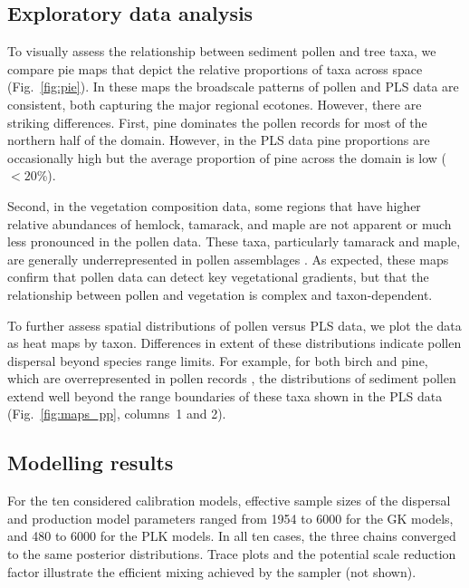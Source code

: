 \documentclass[12pt]{article}
\begin{document}
\subsection{Exploratory data analysis}

To visually assess the relationship between sediment pollen and tree
taxa, we compare pie maps that depict the relative proportions of taxa
across space (Fig.~\ref{fig:pie}). In these maps the broadscale
patterns of pollen and PLS data are consistent, both capturing the
major regional ecotones.  However, there are striking
differences. First, pine dominates the pollen records for most of the
northern half of the domain. However, in the PLS data pine proportions
are occasionally high but the average proportion of pine across the
domain is low ($<20$\%).

Second, in the vegetation composition data, some regions that have
higher relative abundances of hemlock, tamarack, and maple are not
apparent or much less pronounced in the pollen data. These taxa,
particularly tamarack and maple, are generally underrepresented in
pollen assemblages \citep{webb1981estimating,
  bradshaw1985relationships, jackson1990}. As expected, these maps
confirm that pollen data can detect key vegetational gradients, but
that the relationship between pollen and vegetation is complex and
taxon-dependent.

To further assess spatial distributions of pollen versus PLS data, we
plot the data as heat maps by taxon. Differences in extent of these
distributions indicate pollen dispersal beyond species range
limits. For example, for both birch and pine, which are
overrepresented in pollen records \citep{webb1981estimating,
  bradshaw1985relationships, jackson1990, williams2003palynological},
the distributions of sediment pollen extend well beyond the range
boundaries of these taxa shown in the PLS data
(Fig.~\ref{fig:maps_pp}, columns~1 and 2).

\subsection{Modelling results}

For the ten considered calibration models, effective sample sizes of
the dispersal and production model parameters ranged from 1954 to 6000
for the GK models, and 480 to 6000 for the PLK models. In all ten
cases, the three chains converged to the same posterior
distributions. Trace plots and the potential scale reduction factor
illustrate the efficient mixing achieved by the sampler (not shown).
\end{document}

